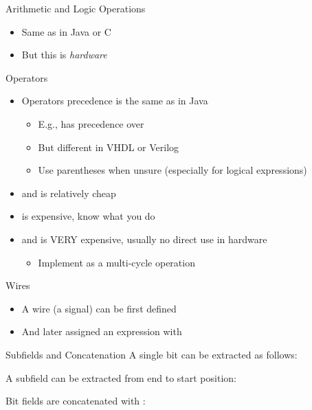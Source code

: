 \begin{frame}[fragile]{Arithmetic and Logic Operations}
\begin{itemize}
\item Same as in Java or C
\item But this is \emph{hardware}
\end{itemize}
\end{frame}

\begin{frame}[fragile]{Operators}
\begin{itemize}
\item Operators precedence is the same as in Java
\begin{itemize}
\item E.g., \code{*} has precedence over \code{+}
\item But different in VHDL or Verilog
\item Use parentheses when unsure (especially for logical expressions)
\end{itemize}
\item \code{+} and \code{-} is relatively cheap
\item \code{*} is expensive, know what you do
\item \code{/} and \code{\%} is VERY expensive, usually no direct use in hardware
\begin{itemize}
\item Implement as a multi-cycle operation
\end{itemize}
\end{itemize}
\end{frame}

\begin{frame}[fragile]{Wires}
\begin{itemize}
\item A wire (a signal) can be first defined
\item And later assigned an expression with \code{:=}
\end{itemize}
\end{frame}

\begin{frame}[fragile]{Subfields and Concatenation}
A single bit can be extracted as follows:

\noindent A subfield can be extracted from end to start position:

\noindent Bit fields are concatenated with :
\end{frame}


